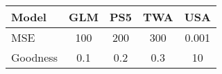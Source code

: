\begin{tabular}{l|cccc}
    \toprule
Model & GLM & PS5 & TWA & USA \\
\midrule
    MSE & 100 & 200 & 300 & 0.001 \\
    Goodness & 0.1 & 0.2 & 0.3 & 10 \\
    \bottomrule
\end{tabular}
